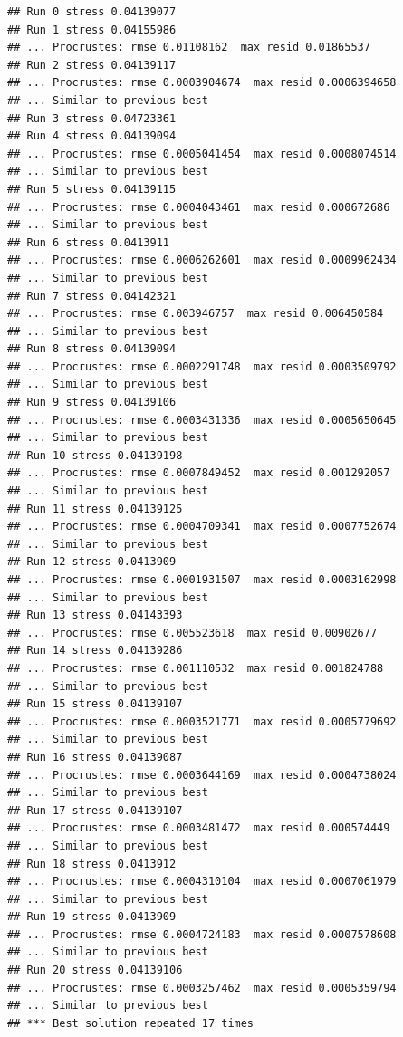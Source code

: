 \documentclass[
]{article}
\begin{document}
\begin{verbatim}
## Run 0 stress 0.04139077 
## Run 1 stress 0.04155986 
## ... Procrustes: rmse 0.01108162  max resid 0.01865537 
## Run 2 stress 0.04139117 
## ... Procrustes: rmse 0.0003904674  max resid 0.0006394658 
## ... Similar to previous best
## Run 3 stress 0.04723361 
## Run 4 stress 0.04139094 
## ... Procrustes: rmse 0.0005041454  max resid 0.0008074514 
## ... Similar to previous best
## Run 5 stress 0.04139115 
## ... Procrustes: rmse 0.0004043461  max resid 0.000672686 
## ... Similar to previous best
## Run 6 stress 0.0413911 
## ... Procrustes: rmse 0.0006262601  max resid 0.0009962434 
## ... Similar to previous best
## Run 7 stress 0.04142321 
## ... Procrustes: rmse 0.003946757  max resid 0.006450584 
## ... Similar to previous best
## Run 8 stress 0.04139094 
## ... Procrustes: rmse 0.0002291748  max resid 0.0003509792 
## ... Similar to previous best
## Run 9 stress 0.04139106 
## ... Procrustes: rmse 0.0003431336  max resid 0.0005650645 
## ... Similar to previous best
## Run 10 stress 0.04139198 
## ... Procrustes: rmse 0.0007849452  max resid 0.001292057 
## ... Similar to previous best
## Run 11 stress 0.04139125 
## ... Procrustes: rmse 0.0004709341  max resid 0.0007752674 
## ... Similar to previous best
## Run 12 stress 0.0413909 
## ... Procrustes: rmse 0.0001931507  max resid 0.0003162998 
## ... Similar to previous best
## Run 13 stress 0.04143393 
## ... Procrustes: rmse 0.005523618  max resid 0.00902677 
## Run 14 stress 0.04139286 
## ... Procrustes: rmse 0.001110532  max resid 0.001824788 
## ... Similar to previous best
## Run 15 stress 0.04139107 
## ... Procrustes: rmse 0.0003521771  max resid 0.0005779692 
## ... Similar to previous best
## Run 16 stress 0.04139087 
## ... Procrustes: rmse 0.0003644169  max resid 0.0004738024 
## ... Similar to previous best
## Run 17 stress 0.04139107 
## ... Procrustes: rmse 0.0003481472  max resid 0.000574449 
## ... Similar to previous best
## Run 18 stress 0.0413912 
## ... Procrustes: rmse 0.0004310104  max resid 0.0007061979 
## ... Similar to previous best
## Run 19 stress 0.0413909 
## ... Procrustes: rmse 0.0004724183  max resid 0.0007578608 
## ... Similar to previous best
## Run 20 stress 0.04139106 
## ... Procrustes: rmse 0.0003257462  max resid 0.0005359794 
## ... Similar to previous best
## *** Best solution repeated 17 times
\end{verbatim}
\end{document}

